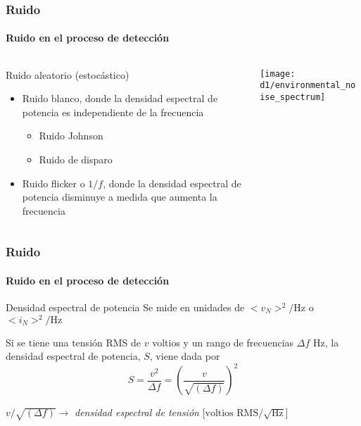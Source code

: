 \documentclass{beamer}
\begin{document}
\begin{frame}
\frametitle{Ruido}
\framesubtitle{Ruido en el proceso de detección}
\begin{columns}
\begin{column}{0.5\textwidth}
\begin{block}{Ruido aleatorio (estocástico)}
\begin{itemize}
\item Ruido blanco, donde la densidad espectral de potencia es
independiente de la frecuencia
\begin{itemize}
\item Ruido Johnson
\item Ruido de disparo 
\end{itemize}
\item Ruido flicker o $1/f$, donde la densidad espectral de potencia disminuye a
medida que aumenta la frecuencia
\end{itemize}
\end{block}
\end{column}
\begin{column}{0.5\textwidth}
\begin{center}
\texttt{[image: d1/environmental\_noise\_spectrum]}
\end{center}
\end{column}
\end{columns}
\end{frame} 

\begin{frame}
\frametitle{Ruido}
\framesubtitle{Ruido en el proceso de detección}
\begin{block}{Densidad espectral de potencia}
Se mide en unidades de $<\!v_N\!>^2/\text{Hz}$ o $<\!i_N\!>^2/\text{Hz}$

Si se tiene una tensión RMS de $v$ voltios y un rango de frecuencias $\Delta f$
Hz, la densidad espectral de potencia, $S$, viene dada por
{\color{blue}$$S = \frac{v^2}{\Delta f} = \left(\frac{v}{\sqrt{(\Delta
f)}}\right)^2$$}

$v/\sqrt{(\Delta f)} \rightarrow$ \textit{densidad espectral de tensión}
[$\text{voltios RMS}/\sqrt{\text{Hz}}$]
\end{block}
\end{frame} 
\end{document}
